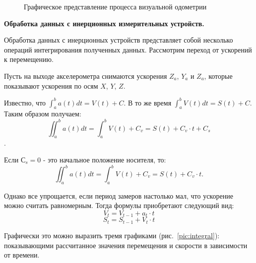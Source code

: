 \begin{figure}[!htb]
\caption{Графическое представление процесса визуальной одометрии}
\label{pic:visOdometryProc}
\end{figure}

\textbf{Обработка данных с инерционных измерительных устройств.}

Обработка данных с инерционных устройств представляет собой несколько операций интегрирования полученных данных. 
Рассмотрим переход от ускорений к перемещению.

Пусть на выходе акселерометра снимаются ускорения $Z_a$, $Y_a$ и $Z_a$, которые показывают ускорения по осям $X$, $Y$, $Z$.

Известно, что $ \int_a^b a(t)dt = V(t)+C $.
В то же время $ \int_a^b V(t)dt = S(t)+C $. Таким образом получаем:
$$
\iint_a^b a(t)dt = \int_a^b V(t) + C_v = S(t) + C_v \cdot t + C_s 
$$.

Если $С_s= 0$ - это начальное положение носителя, то:
$$
\iint_a^b a(t)dt = \int_a^b V(t) + C_v = S(t) + C_v \cdot t .
$$

Однако все упрощается, если период замеров настолько мал, что ускорение можно считать равномерным. Тогда формулы приобретают следующий вид:
$$ V_t = V_{t-1} + a_t \cdot t$$
$$ S_t = S_{t-1} + V_t \cdot t $$

Графически это можно выразить тремя графиками (рис.~\ref{pic:integral}): показывающими рассчитанное значения перемещения и скорости в зависимости от времени. 


